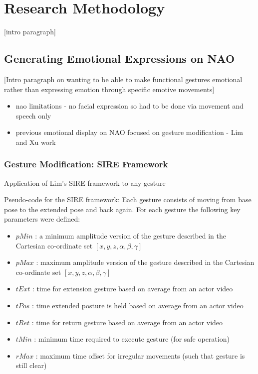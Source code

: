 \documentclass[11pt,a4paper]{report}
\begin{document}
\chapter{Research Methodology}
[intro paragraph]
\section{Generating Emotional Expressions on NAO}
[Intro paragraph on wanting to be able to make functional gestures emotional rather than expressing emotion through specific emotive movements]

\begin{itemize}
	\item nao limitations - no facial expression so had to be done via movement and speech only
	\item previous emotional display on NAO focused on gesture modification - Lim and Xu work
	
\end{itemize}

\subsection{Gesture Modification: SIRE Framework}
Application of Lim's SIRE framework to any gesture

Pseudo-code for the SIRE framework:
Each gesture consists of moving from base pose to the extended pose and back again. For each gesture the following key parameters were defined:
\begin{itemize}
\item $pMin$ : a minimum amplitude version of the gesture described in the Cartesian co-ordinate set $[x,y,z,\alpha,\beta,\gamma]$
\item $pMax$ : maximum amplitude version of the gesture described in the Cartesian co-ordinate set $[x,y,z,\alpha,\beta,\gamma]$
\item $tExt$ : time for extension gesture based on average from an actor video
\item $tPos$ : time extended posture is held based on average from an actor video
\item $tRet$ : time for return gesture based on average from an actor video
\item $tMin$ : minimum time required to execute gesture (for safe operation)
\item $rMax$ : maximum time offset for irregular movements (such that gesture is still clear)
\end{itemize}
\end{document}
